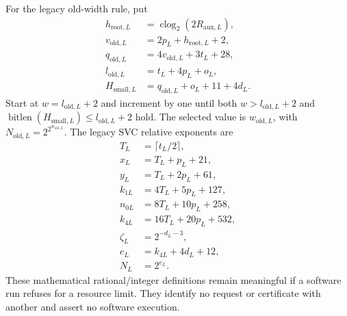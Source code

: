 For the legacy old-width rule, put
\begin{align*}
 h_{\mathrm{root},L}&=\operatorname{clog}_2(2R_{\mathrm{aux},L}),\\
 v_{\mathrm{old},L}&=2p_L+h_{\mathrm{root},L}+2,\\
 q_{\mathrm{old},L}&=4v_{\mathrm{old},L}+3t_L+28,\\
 l_{\mathrm{old},L}&=t_L+4p_L+o_L,\\
 H_{\mathrm{small},L}&=q_{\mathrm{old},L}+o_L+11+4d_L.
\end{align*}
Start at $w=l_{\mathrm{old},L}+2$ and increment by one until both
$w>l_{\mathrm{old},L}+2$ and
$\operatorname{bitlen}(H_{\mathrm{small},L})\le l_{\mathrm{old},L}+2$ hold.
The selected value is $w_{\mathrm{old},L}$, with
$N_{\mathrm{old},L}=2^{2^{w_{\mathrm{old},L}}}$. The legacy SVC relative
exponents are
\begin{align*}
 T_L&=\lceil t_L/2\rceil,\\
 x_L&=T_L+p_L+21,\\
 y_L&=T_L+2p_L+61,\\
 k_{1L}&=4T_L+5p_L+127,\\
 n_{0L}&=8T_L+10p_L+258,\\
 k_{4L}&=16T_L+20p_L+532,\\
 \zeta_L&=2^{-d_L-3},\\
 e_L&=k_{4L}+4d_L+12,\\
 N_L&=2^{e_L}.
\end{align*}
These mathematical rational/integer definitions remain meaningful if a
software run refuses for a resource limit. They identify no request or
certificate with another and assert no software execution.


